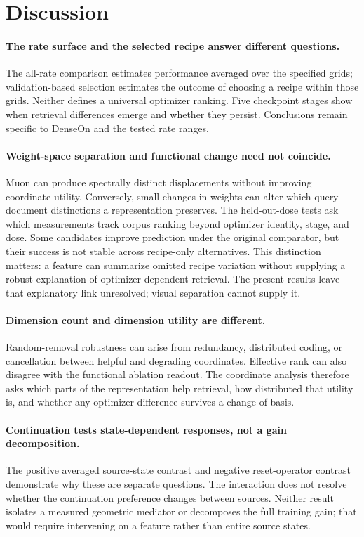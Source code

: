 \documentclass[11pt]{article}
\begin{document}
\section{Discussion}

\paragraph{The rate surface and the selected recipe answer different questions.}
The all-rate comparison estimates performance averaged over the specified grids; validation-based
selection estimates the outcome of choosing a recipe within those grids. Neither defines a
universal optimizer ranking. Five checkpoint stages show when retrieval differences emerge and
whether they persist. Conclusions remain specific to DenseOn and the tested rate ranges.

\paragraph{Weight-space separation and functional change need not coincide.}
Muon can produce spectrally distinct displacements without improving coordinate utility. Conversely,
small changes in weights can alter which query--document distinctions a representation preserves.
The held-out-dose tests ask which measurements track corpus ranking beyond optimizer identity,
stage, and dose. Some candidates improve prediction under the original comparator, but their
success is not stable across recipe-only alternatives. This distinction matters: a feature can
summarize omitted recipe variation without supplying a robust explanation of optimizer-dependent
retrieval. The present results leave that explanatory link unresolved; visual separation cannot
supply it.

\paragraph{Dimension count and dimension utility are different.}
Random-removal robustness can arise from redundancy, distributed coding, or cancellation between
helpful and degrading coordinates. Effective rank can also disagree with the functional ablation
readout. The coordinate analysis therefore asks which parts of the representation help retrieval,
how distributed that utility is, and whether any optimizer difference survives a change of basis.

\paragraph{Continuation tests state-dependent responses, not a gain decomposition.}
The positive averaged source-state contrast and negative reset-operator contrast demonstrate why
these are separate questions. The interaction does not resolve whether the continuation preference
changes between sources. Neither result isolates a measured geometric mediator or decomposes the
full training gain; that would require intervening on a feature rather than entire source states.
\end{document}
